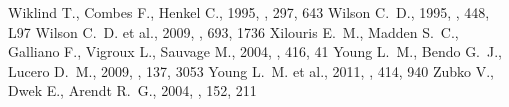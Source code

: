 \begin{thebibliography}{}
 Wiklind T., Combes F., Henkel C., 1995, \aap, 297, 643
 Wilson C.~D., 1995, \apjl, 448, L97
 Wilson C.~D. et al., 2009, \apj, 693, 1736
 Xilouris E.~M., Madden S.~C., Galliano F., Vigroux L., Sauvage M., 2004, \aap, 416, 41
 Young L.~M., Bendo G.~J., Lucero D.~M., 2009, \aj, 137, 3053
 Young L.~M. et al., 2011, \mnras, 414, 940
 Zubko V., Dwek E., Arendt R.~G., 2004, \apjs, 152, 211
\end{thebibliography}


%
%